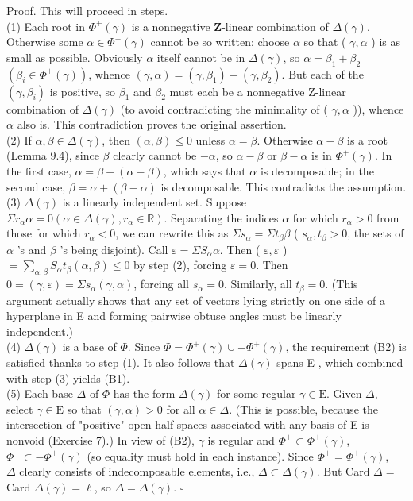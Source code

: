 \documentclass[10pt]{article}
\begin{document}
Proof. This will proceed in steps.\\
(1) Each root in $\Phi^{+}(\gamma)$ is a nonnegative $\mathbf{Z}$-linear combination of $\Delta(\gamma)$. Otherwise some $\alpha \in \Phi^{+}(\gamma)$ cannot be so written; choose $\alpha$ so that ( $\gamma, \alpha$ ) is as small as possible. Obviously $\alpha$ itself cannot be in $\Delta(\gamma)$, so $\alpha=\beta_{1}+\beta_{2}$ $\left(\beta_{i} \in \Phi^{+}(\gamma)\right)$, whence $(\gamma, \alpha)=\left(\gamma, \beta_{1}\right)+\left(\gamma, \beta_{2}\right)$. But each of the $\left(\gamma, \beta_{i}\right)$ is positive, so $\beta_{1}$ and $\beta_{2}$ must each be a nonnegative Z-linear combination of $\Delta(\gamma)$ (to avoid contradicting the minimality of ( $\gamma, \alpha$ )), whence $\alpha$ also is. This contradiction proves the original assertion.\\
(2) If $\alpha, \beta \in \Delta(\gamma)$, then $(\alpha, \beta) \leq 0$ unless $\alpha=\beta$. Otherwise $\alpha-\beta$ is a root (Lemma 9.4), since $\beta$ clearly cannot be $-\alpha$, so $\alpha-\beta$ or $\beta-\alpha$ is in $\Phi^{+}(\gamma)$. In the first case, $\alpha=\beta+(\alpha-\beta)$, which says that $\alpha$ is decomposable; in the second case, $\beta=\alpha+(\beta-\alpha)$ is decomposable. This contradicts the assumption.\\
(3) $\Delta(\gamma)$ is a linearly independent set. Suppose $\Sigma r_{\alpha} \alpha=0\left(\alpha \in \Delta(\gamma), r_{\alpha} \in \mathbb{R}\right)$. Separating the indices $\alpha$ for which $r_{\alpha}>0$ from those for which $r_{\alpha}<0$, we can rewrite this as $\Sigma s_{\alpha}=\Sigma t_{\beta} \beta$ ( $s_{\alpha}, t_{\beta}>0$, the sets of $\alpha$ 's and $\beta$ 's being disjoint). Call $\varepsilon=\Sigma S_{\alpha} \alpha$. Then ( $\varepsilon, \varepsilon$ ) $=\sum_{\alpha, \beta} S_{\alpha} t_{\beta}(\alpha, \beta) \leq 0$ by step (2), forcing $\varepsilon=0$. Then $0=(\gamma, \varepsilon)=\Sigma s_{\alpha}(\gamma, \alpha)$, forcing all $s_{\alpha}=0$. Similarly, all $t_{\beta}=0$. (This argument actually shows that any set of vectors lying strictly on one side of a hyperplane in E and forming pairwise obtuse angles must be linearly independent.)\\
(4) $\Delta(\gamma)$ is a base of $\Phi$. Since $\Phi=\Phi^{+}(\gamma) \cup-\Phi^{+}(\gamma)$, the requirement (B2) is satisfied thanks to step (1). It also follows that $\Delta(\gamma)$ spans E , which combined with step (3) yields (B1).\\
(5) Each base $\Delta$ of $\Phi$ has the form $\Delta(\gamma)$ for some regular $\gamma \in \mathrm{E}$. Given $\Delta$, select $\gamma \in \mathrm{E}$ so that $(\gamma, \alpha)>0$ for all $\alpha \in \Delta$. (This is possible, because the intersection of "positive" open half-spaces associated with any basis of E is nonvoid (Exercise 7).) In view of (B2), $\gamma$ is regular and $\Phi^{+} \subset \Phi^{+}(\gamma)$, $\Phi^{-} \subset-\Phi^{+}(\gamma)$ (so equality must hold in each instance). Since $\Phi^{+}=\Phi^{+}(\gamma)$,\\
$\Delta$ clearly consists of indecomposable elements, i.e., $\Delta \subset \Delta(\gamma)$. But Card $\Delta=$ Card $\Delta(\gamma)=\ell$, so $\Delta=\Delta(\gamma)$. $\square$
\end{document}
